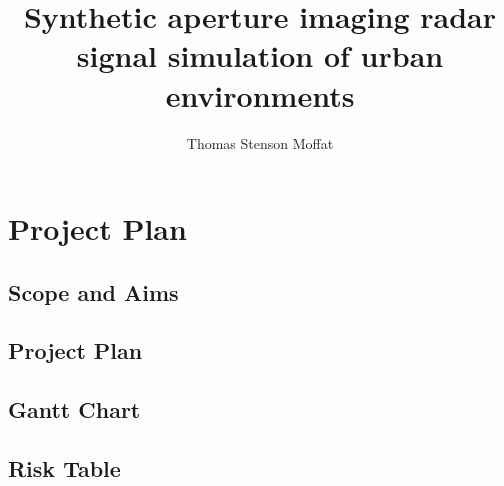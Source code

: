 \documentclass[11pt]{report}
\title{Synthetic aperture imaging radar signal simulation of urban environments}
\author{Thomas Stenson Moffat}
\begin{document}
	
	\chapter{Project Plan}
	\section{Scope and Aims}
	
	\section{Project Plan}
	
	\section{Gantt Chart}
	
	\section{Risk Table}
	
	
		
\end{document}
